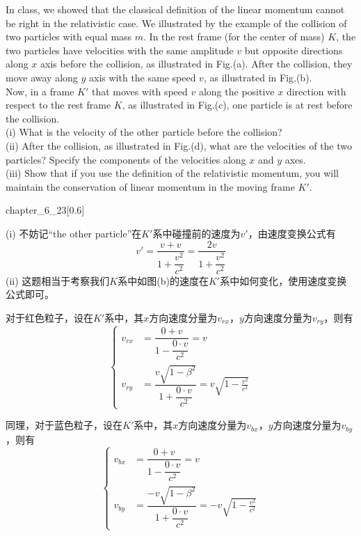 \begin{solution}
	In class, we showed that the classical definition of the linear
	momentum cannot be right in the relativistic case. We illustrated by the
	example of the collision of two particles with equal mass $m$. In the rest
	frame (for the center of mass) $K$, the two particles have velocities with
	the same amplitude $v$ but opposite directions along $x$ axis before the
	collision, as illustrated in Fig.(a). After the collision, they move away along $y$ axis with the same speed $v$, as illustrated in Fig.(b). \\Now, in a frame $K'$ that moves with speed $v$ along the positive $x$ direction with respect to the rest frame $K$, as illustrated in Fig.(c), one particle is at rest before the
	collision. 
	\\(i) What is the velocity of the other particle before the
	collision? 
	\\(ii) After the collision, as illustrated in Fig.(d), what are the velocities of
	the two particles? Specify the components of the velocities along $x$ and
	$y$ axes.
	\\(iii) Show that if you use the definition of the relativistic
	momentum, you will maintain the conservation of linear momentum in
	the moving frame $K'$.
	\begin{singlefigure}{chapter_6_23}[0.6]   
	\end{singlefigure}
	
	\tcbrule
	
      (i) 不妨记``the other particle''在$K'$系中碰撞前的速度为$v'$，由速度变换公式有
        \[v'=\dfrac{v+v}{1+\dfrac{v^{2}}{c^{2}}}=\dfrac{2v}{1+\dfrac{v^{2}}{c^{2}}} \]
      (ii) 这题相当于考察我们$K$系中如图(b)的速度在$K'$系中如何变化，使用速度变换公式即可。
      
      对于红色粒子，设在$K'$系中，其$x$方向速度分量为$v_{rx}$，$y$方向速度分量为$v_{ry}$，则有
      \[\left\{\begin{aligned}
      	v_{rx}&=\dfrac{0+v}{1-\dfrac{0\cdot v}{c^2}}=v\\
      	v_{ry}&=\dfrac{v\sqrt{1-\beta^{2}}}{1+\dfrac{0\cdot v}{c^{2}}}=v\sqrt{1-\frac{v^{2}}{c^{2}}}
      \end{aligned}\right.
      \]
      
        
      同理，对于蓝色粒子，设在$K'$系中，其$x$方向速度分量为$v_{bx}$，$y$方向速度分量为$v_{by}$，则有
      \[\left\{\begin{aligned}
      	v_{bx}&=\dfrac{0+v}{1-\dfrac{0\cdot v}{c^2}}=v\\
      	v_{by}&=\dfrac{-v\sqrt{1-\beta^{2}}}{1+\dfrac{0\cdot v}{c^{2}}}=-v\sqrt{1-\frac{v^{2}}{c^{2}}}
      \end{aligned}\right.
      \]
        

\end{solution}
